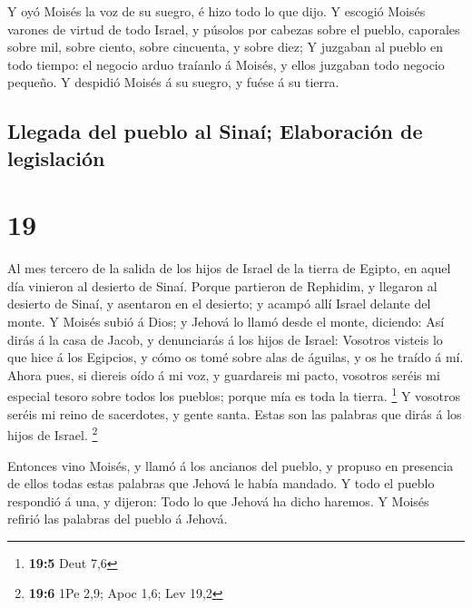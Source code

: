  Y oyó Moisés la voz de su suegro, é hizo todo lo que
dijo.  Y escogió Moisés varones de virtud de todo Israel,
y púsolos por cabezas sobre el pueblo, caporales sobre mil, sobre
ciento, sobre cincuenta, y sobre diez;  Y juzgaban al
pueblo en todo tiempo: el negocio arduo traíanlo á Moisés, y ellos
juzgaban todo negocio pequeño.  Y despidió Moisés á su
suegro, y fuése á su tierra.

\hypertarget{llegada-del-pueblo-al-sinauxed-elaboraciuxf3n-de-legislaciuxf3n}{%
\subsection{Llegada del pueblo al Sinaí; Elaboración de
legislación}\label{llegada-del-pueblo-al-sinauxed-elaboraciuxf3n-de-legislaciuxf3n}}

\hypertarget{section-18}{%
\section{19}\label{section-18}}

 Al mes tercero de la salida de los hijos de Israel de la
tierra de Egipto, en aquel día vinieron al desierto de Sinaí.
 Porque partieron de Rephidim, y llegaron al desierto de
Sinaí, y asentaron en el desierto; y acampó allí Israel delante del
monte.  Y Moisés subió á Dios; y Jehová lo llamó desde el
monte, diciendo: Así dirás á la casa de Jacob, y denunciarás á los hijos
de Israel:  Vosotros visteis lo que hice á los Egipcios, y
cómo os tomé sobre alas de águilas, y os he traído á mí. 
Ahora pues, si diereis oído á mi voz, y guardareis mi pacto, vosotros
seréis mi especial tesoro sobre todos los pueblos; porque mía es toda la
tierra. \footnote{\textbf{19:5} Deut 7,6}  Y vosotros
seréis mi reino de sacerdotes, y gente santa. Estas son las palabras que
dirás á los hijos de Israel. \footnote{\textbf{19:6} 1Pe 2,9; Apoc 1,6;
  Lev 19,2}

 Entonces vino Moisés, y llamó á los ancianos del pueblo,
y propuso en presencia de ellos todas estas palabras que Jehová le había
mandado.  Y todo el pueblo respondió á una, y dijeron:
Todo lo que Jehová ha dicho haremos. Y Moisés refirió las palabras del
pueblo á Jehová.

